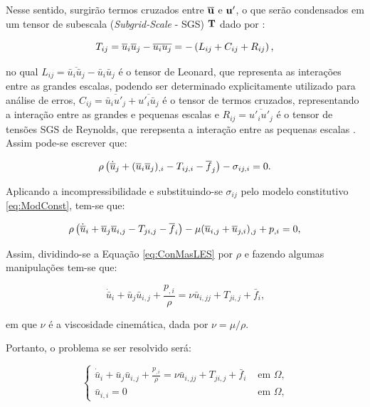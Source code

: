 Nesse sentido, surgirão termos cruzados entre $\overline{\mathbf{u}}$ e $\mathbf{u}'$, o que serão condensados em um tensor de subescala (\textit{Subgrid-Scale} - SGS) $\mathbf{T}$ dado por \cite{piomelli1999large,hughes2000large}:

\begin{equation}
    T_{ij}=\overline{u}_i\overline{u}_j-\overline{u_iu_j}=-\left({L_{ij}+C_{ij}+R_{ij}}\right)\text{,}
\end{equation}

\noindent no qual $L_{ij}=\overline{\bar{u}_i\bar{u}_j}-\bar{u}_i\bar{u}_j$ é o tensor de Leonard, que representa as interações entre as grandes escalas, podendo ser determinado explicitamente utilizado para análise de erros, $C_{ij}=\overline{\bar{u}_iu'_j}+\overline{u'_i\bar{u}_j}$ é o tensor de termos cruzados, representando a interação entre as grandes e pequenas escalas e $R_{ij}=\overline{u'_iu'_j}$ é o tensor de tensões SGS de Reynolds, que rerepsenta a interação entre as pequenas escalas \cite{piomelli1999large}. Assim pode-se escrever que:

\begin{equation}
    \rho\left({\dot{\overline{u}}_j+(\overline{u}_i\overline{u}_j)_{,i}-T_{ij,i}-\overline{f}_j}\right)-\sigma_{ij,i}=0\text{.}
\end{equation}

Aplicando a incompressibilidade e substituindo-se $\sigma_{ij}$ pelo modelo constitutivo \ref{eq:ModConst}, tem-se que:

\begin{equation}
    \rho\left({\dot{\overline{u}}_i+\overline{u}_j\overline{u}_{i,j}-T_{ji,j}-\overline{f}_i}\right)-\mu(\overline{u}_{i,j}+\overline{u}_{j,i})_{,j}+p_{,i}=0\text{,}\label{eq:ConMasLES}
\end{equation}

\noindent Assim, dividindo-se a Equação \ref{eq:ConMasLES} por $\rho$ e fazendo algumas manipulações tem-se que:

\begin{equation}
    \dot{\bar{u}}_i+\bar{u}_j\bar{u}_{i,j}+\frac{p_{,i}}{\rho}=\nu\bar{u}_{i,jj}+T_{ji,j}+\bar{f}_i\text{,}
\end{equation}

\noindent em que $\nu$ é a viscosidade cinemática, dada por $\nu=\mu/\rho$.

Portanto, o problema se ser resolvido será:

\begin{equation}
    \left\{
    \begin{array}{ll}
        \dot{\bar{u}}_i+\bar{u}_j\bar{u}_{i,j}+\frac{p_{,i}}{\rho}=\nu\bar{u}_{i,jj}+T_{ji,j}+\bar{f}_i & \text{ em }\Omega\text{,} \\
        \bar{u}_{i,i}=0                                                                                 & \text{ em }\Omega\text{,}
    \end{array}
    \right.
\end{equation}

